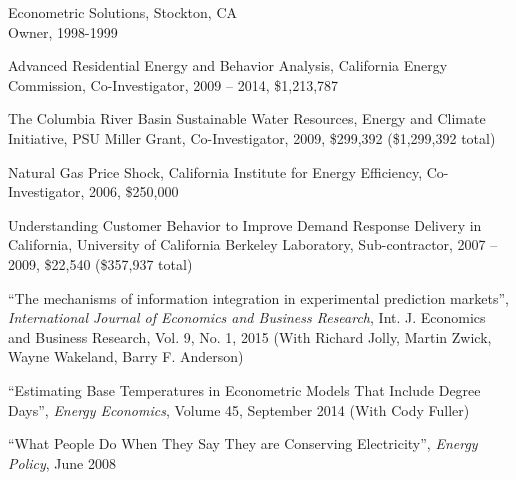 \documentclass[Computer Science]{vita}
\begin{document}
\begin{vita}
\begin{Experience}
  \item Econometric Solutions, Stockton, CA\\
    Owner, 1998-1999
% 		
	  \end{Experience}

 \begin{Selected Grants and Sponsored Research}

\item Advanced Residential Energy and Behavior Analysis, California Energy Commission, Co-Investigator, 2009 -- 2014, \$1,213,787

\item The Columbia River Basin Sustainable Water Resources, Energy and Climate Initiative,  PSU Miller Grant, Co-Investigator, 2009, \$299,392 (\$1,299,392 total)

  \item Natural Gas Price Shock, California Institute for Energy
    Efficiency, Co-Investigator, 2006, \$250,000


  \item Understanding Customer Behavior to Improve Demand Response Delivery in California, University of California Berkeley Laboratory, Sub-contractor, 2007 -- 2009, \$22,540 (\$357,937 total)


  \end{Selected Grants and Sponsored Research}

  \begin{Selected Publications}


    \begin{Papers in Refereed Journals}
    
 \item ``The mechanisms of information integration in experimental prediction markets'',  \emph{International Journal of Economics and Business Research}, Int. J. Economics and Business Research, Vol. 9, No. 1, 2015 (With Richard Jolly, Martin Zwick, Wayne Wakeland, Barry F. Anderson)
      
    \item ``Estimating Base Temperatures in Econometric Models That Include Degree Days'',  \emph{Energy Economics}, Volume 45, September 2014 (With Cody Fuller)
    
   
    \item ``What People Do When They Say They are Conserving
      Electricity'', \emph{Energy Policy}, June 2008



\end{Papers in Refereed Journals}
\end{Selected Publications}
\end{vita}
\end{document}
